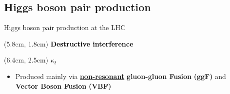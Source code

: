 \subsection{Higgs boson pair production}

\begin{frame}{Higgs boson pair production at the LHC}
\begin{textblock*}{5cm}(5.8cm, 1.8cm) %
  \textcolor{black}{\textbf{Destructive interference}}
\end{textblock*}

\begin{textblock*}{5cm}(6.4cm, 2.5cm) %
  \textcolor{black}{$\kappa_t$}
\end{textblock*}

\begin{itemize}
    \item Produced mainly via \textbf{\underline{non-resonant}} \textbf{\textcolor{HHred}{gluon-gluon Fusion}} \textbf{(ggF)} and \textbf{\textcolor{HHturquoise_d}{Vector Boson Fusion}} \textbf{(VBF)}
\end{itemize}


\end{frame}
